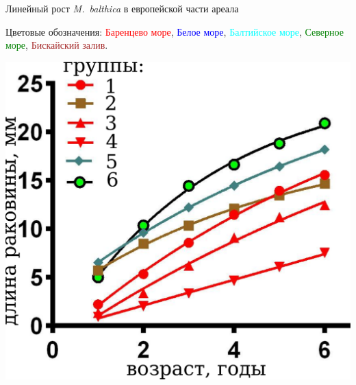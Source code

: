 \documentclass{beamer}
\begin{document}
\begin{frame}{Линейный рост {\it M.~balthica} в европейской части ареала}
\begin{minipage}[t]{.52\linewidth}
Цветовые обозначения: \textcolor{red}{Баренцево море}, 
\textcolor{blue}{Белое море}, 
\textcolor{cyan}{Балтийское море}, 
\textcolor{green}{Северное море}, 
\textcolor{brown}{Бискайский залив}.
	\end{minipage}
%
	\begin{minipage}[t]{.45\linewidth}
		\begin{center}
			\includegraphics[width=\textwidth]{./Europe_growth_groups_prizm.pdf}
		\end{center}
	\end{minipage}
\end{frame}

\end{document}
